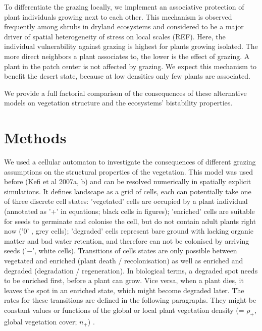 To differentiate the grazing locally, we implement an associative protection of plant individuals growing next to each other. This mechanism is observed frequently among shrubs in dryland ecosystems and considered to be a major driver of spatial heterogeneity of stress on local scales (REF). 
Here, the individual vulnerability against grazing is highest for plants growing isolated. The more direct neighbors a plant associates to, the lower is the effect of grazing. A plant in the patch center is not affected by grazing. We expect this mechanism to benefit the desert state, because at low densities only few plants are associated.


 We provide a full factorial comparison of the consequences of these alternative models on vegetation structure and the ecosystems' bistability properties.


\section{Methods}
We used a cellular automaton to investigate the consequences of different grazing assumptions on the structural properties of the vegetation. This model was used before (Kefi et al 2007a, b) and can be resolved numerically in spatially explicit simulations. It defines landscape as a grid of cells, each can potentially take one of three discrete cell states: 'vegetated' cells are occupied by a plant individual (annotated as '+' in equations; black cells in figures); 'enriched' cells are suitable for seeds to germinate and colonise the cell, but do not contain adult plants right now  ('0' , grey cells); 'degraded' cells represent bare ground with lacking organic matter and bad water retention, and therefore can not be colonised by arriving seeds  ('$-$', white cells).
Transitions of cells states are only possible between vegetated and enriched (plant death / recolonisation) as well as enriched and degraded (degradation / regeneration). In biological terms, a degraded spot needs to be enriched first, before a plant can grow. Vice versa, when a plant dies, it leaves the spot in an enriched state, which might become degraded later. The rates for these transitions are defined in the following paragraphs. They might be constant values or functions of the global or local plant vegetation density (= $\rho_+$, global vegetation cover; $n_+$) .

